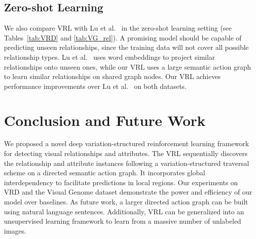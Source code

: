 \documentclass[10pt,twocolumn,letterpaper]{article}
\begin{document}
\subsection{Zero-shot Learning} We also compare VRL with Lu et al.~\cite{lu2016visual} in the zero-shot learning setting (see Tables~\ref{tab:VRD} and \ref{tab:VG_rel}). A promising model should be capable of predicting unseen relationships, since the training data will not cover all possible relationship types. Lu et al.~\cite{lu2016visual} uses word embeddings to project similar relationships onto unseen ones, while our VRL uses a large semantic action graph to learn similar relationships on shared graph nodes. Our VRL achieves  performance improvements over Lu et al.~\cite{lu2016visual} on both datasets.


 
\section{Conclusion and Future Work}

We proposed a novel deep variation-structured reinforcement learning framework for detecting visual relationships and attributes. The VRL sequentially discovers the relationship and attribute instances following a variation-structured traversal scheme on a directed semantic action graph. It incorporates global interdependency to facilitate predictions in local regions. Our experiments on VRD and the Visual Genome dataset demonstrate the power and efficiency of our model over baselines. As future work, a larger directed action graph can be built using natural language sentences. Additionally, VRL can be generalized into an unsupervised learning framework to learn from a massive number of unlabeled images.

{\small


}
\end{document}
